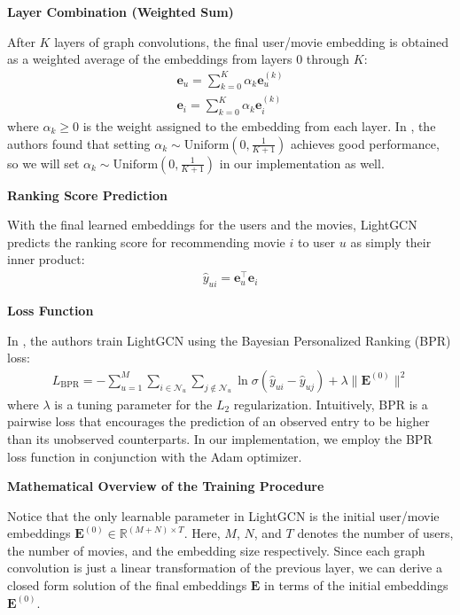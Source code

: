 \documentclass{article}
\begin{document}
\textbf{Layer Combination (Weighted Sum)}

After $K$ layers of graph convolutions, the final user/movie embedding is obtained as a weighted average of the embeddings from layers $0$ through $K$:
\begin{align*}
    \mathbf{e}_u = \sum_{k = 0}^K \alpha_k \mathbf{e}_u^{(k)} \\
    \mathbf{e}_i = \sum_{k = 0}^K \alpha_k \mathbf{e}_i^{(k)}
\end{align*}
where $\alpha_k \geq 0$ is the weight assigned to the embedding from each layer. In \cite{lightgcn}, the authors found that setting $\alpha_k \sim \mbox{Uniform}(0, \frac{1}{K + 1})$ achieves good performance, so we will set $\alpha_k \sim \mbox{Uniform}(0, \frac{1}{K+1})$ in our implementation as well.

\textbf{Ranking Score Prediction}

With the final learned embeddings for the users and the movies, LightGCN predicts the ranking score \cite{lightgcn} for recommending movie $i$ to user $u$ as simply their inner product:
\begin{align*}
    \hat{y}_{ui} = \mathbf{e}_u^\top \mathbf{e}_i
\end{align*}

\textbf{Loss Function}

In \cite{lightgcn}, the authors train LightGCN using the Bayesian Personalized Ranking (BPR) loss:
\begin{align*}
    L_{\mbox{BPR}} = - \sum_{u = 1}^M \sum_{i \in \mathcal{N}_u} \sum_{j \notin \mathcal{N}_u} \ln \sigma(\hat{y}_{ui} - \hat{y}_{uj}) + \lambda \| \mathbf{E}^{(0)} \|^2
\end{align*}
where $\lambda$ is a tuning parameter for the $L_2$ regularization. Intuitively, BPR is a pairwise loss that encourages the prediction of an observed entry to be higher than its unobserved counterparts. In our implementation, we employ the BPR loss function in conjunction with the Adam \cite{adam} optimizer.

\textbf{Mathematical Overview of the Training Procedure} \cite{lightgcn}

Notice that the only learnable parameter in LightGCN is the initial user/movie embeddings $\mathbf{E}^{(0)} \in \mathbb{R}^{(M + N) \times T}$. Here, $M$, $N$, and $T$ denotes the number of users, the number of movies, and the embedding size respectively. Since each graph convolution is just a linear transformation of the previous layer, we can derive a closed form solution of the final embeddings $\mathbf{E}$ in terms of the initial embeddings $\mathbf{E}^{(0)}$.
\end{document}
